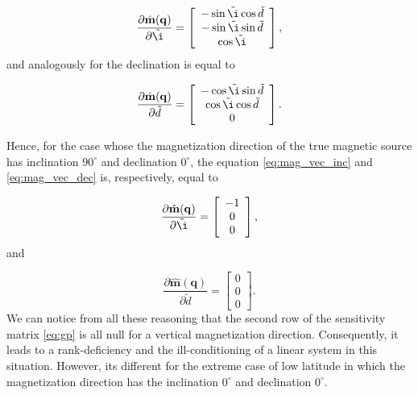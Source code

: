 \begin{equation}
	\dfrac{\partial \hat{\mathbf{m}}(\mathbf{q})}{\partial {\tilde{\i}}} =
	\left[ \begin{array}{c}
		-\sin \tilde{\i} \cos \tilde{d} \\
		-\sin \tilde{\i} \sin \tilde{d}\\
		 \cos \tilde{\i}
	\end{array} \right], 
	\label{eq:mag_vec_inc}
\end{equation}
and analogously for the declination is equal to 

\begin{equation}
	\dfrac{\partial \hat{\mathbf{m}}(\mathbf{q})}{\partial {\tilde{d}}} =
	\left[ \begin{array}{c}
		-\cos \tilde{\i} \sin \tilde{d} \\
		\cos \tilde{\i} \cos \tilde{d}\\
		0
	\end{array} \right]. 
	\label{eq:mag_vec_dec}
\end{equation}

Hence, for the case whose the magnetization direction of the true magnetic source has inclination $90^\circ$ and declination $0^\circ$, the equation \ref{eq:mag_vec_inc} and \ref{eq:mag_vec_dec} is, respectively, equal to 

 
\begin{equation}
	\dfrac{\partial \hat{\mathbf{m}}(\mathbf{q})}{\partial {\tilde{\i}}} =
	\left[ \begin{array}{c}
		-1 \\
		 0 \\
		 0
	\end{array} \right], 
	\label{eq:mag_vec_inc_90}
\end{equation}
and 

\begin{equation}
	\dfrac{\partial \hat{\mathbf{m}}(\mathbf{q})}{\partial {\tilde{d}}} =
	\left[ \begin{array}{c}
		0 \\
		0 \\
		0
	\end{array} \right]. 
	\label{eq:mag_vec_dec_0}
\end{equation}
We can notice from all these reasoning that the second row of the sensitivity matrix \ref{eq:gp} is all null for a vertical magnetization direction. Consequently, it leads to a rank-deficiency and the ill-conditioning of a linear system in this situation. However, its different for the extreme case of low latitude in which the magnetization direction has the inclination $0^\circ$ and declination $0^\circ$. 

           



